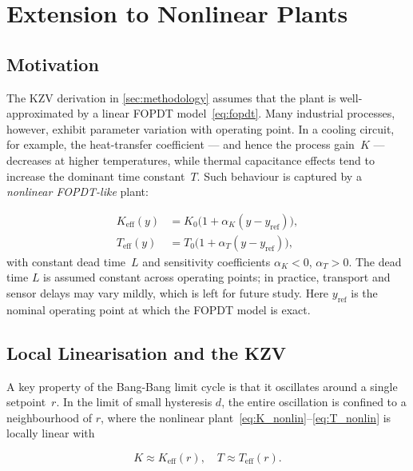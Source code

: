 \section{Extension to Nonlinear Plants}
\label{sec:nonlinear}

\subsection{Motivation}
\label{sec:nonlinear:motivation}

The KZV derivation in \cref{sec:methodology} assumes that the plant is
well-approximated by a linear FOPDT model~\eqref{eq:fopdt}.
Many industrial processes, however, exhibit parameter variation with operating
point.
In a cooling circuit, for example, the heat-transfer coefficient — and hence
the process gain~$K$ — decreases at higher temperatures, while thermal
capacitance effects tend to increase the dominant time constant~$T$.
Such behaviour is captured by a \emph{nonlinear FOPDT-like} plant:

\begin{align}
    K_{\mathrm{eff}}(y) &= K_0 \bigl(1 + \alpha_K (y - y_{\mathrm{ref}})\bigr),
    \label{eq:K_nonlin} \\
    T_{\mathrm{eff}}(y) &= T_0 \bigl(1 + \alpha_T (y - y_{\mathrm{ref}})\bigr),
    \label{eq:T_nonlin}
\end{align}
with constant dead time~$L$ and sensitivity coefficients $\alpha_K < 0$,
$\alpha_T > 0$.
The dead time $L$ is assumed constant across operating points; in practice,
transport and sensor delays may vary mildly, which is left for future study.
Here $y_{\mathrm{ref}}$ is the nominal operating point at which the FOPDT
model is exact.

\subsection{Local Linearisation and the KZV}
\label{sec:nonlinear:local}

A key property of the Bang-Bang limit cycle is that it oscillates around a
single setpoint~$r$.
In the limit of small hysteresis $d$, the entire oscillation is confined to a
neighbourhood of $r$, where the nonlinear plant~\eqref{eq:K_nonlin}--\eqref{eq:T_nonlin}
is locally linear with

\begin{equation}
    K \approx K_{\mathrm{eff}}(r), \quad T \approx T_{\mathrm{eff}}(r).
    \label{eq:local_lin}
\end{equation}


